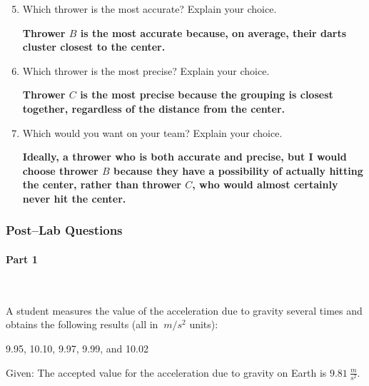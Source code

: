 \begin{enumerate}
	\setcounter{enumi}{4}
	\item Which thrower is the most accurate? Explain your choice.

	      \textbf{Thrower $B$ is the most accurate because, on average, their darts cluster closest to the center.}

	\item Which thrower is the most precise? Explain your choice.

	      \textbf{Thrower $C$ is the most precise because the grouping is closest together, regardless of the distance from the center.}

	\item Which would you want on your team? Explain your choice.

	      \textbf{Ideally, a thrower who is both accurate and precise, but I would choose thrower $B$ because they have a possibility of actually hitting the center, rather than thrower $C$, who would almost certainly never hit the center.}

\end{enumerate}

\subsubsection{Post--Lab Questions}

\paragraph{Part 1}~

A student measures the value of the acceleration due to gravity several times and obtains the following results (all in $\SI{}{m/s^2}$ units):
\begin{center}
	9.95, 10.10, 9.97, 9.99, and 10.02
\end{center}

Given: The accepted value for the acceleration due to gravity on Earth is $\SI{9.81}{\frac{m}{s^2}}$.

\newpage

